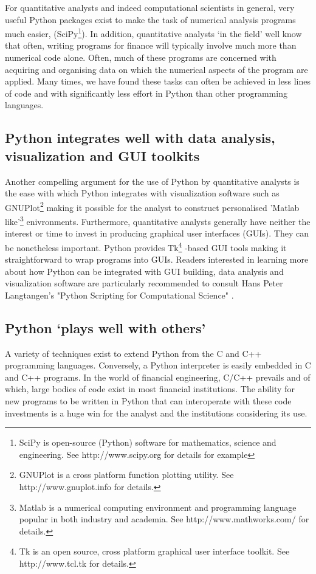 For quantitative analysts and indeed computational scientists in
general, very useful Python packages exist to make the task of
numerical analysis programs much easier, (SciPy\footnote{SciPy is
open-source (Python) software for mathematics, science and
engineering. See http://www.scipy.org for details for
example}). In addition, quantitative analysts `in the field' well know
that often, writing programs for finance will typically involve much
more than numerical code alone. Often, much of these programs are
concerned with acquiring and organising data on which the numerical
aspects of the program are applied. Many times, we have found these
tasks can often be achieved in less lines of code and with significantly
less effort in Python than other programming languages.

\subsection{Python integrates well with data analysis, visualization
and GUI toolkits}
Another compelling argument for the use of Python by quantitative
analysts is the ease with which Python integrates with visualization
software such as GNUPlot\footnote{GNUPlot is a cross platform function
plotting utility. See http://www.gnuplot.info for details.} making it
possible for the analyst to construct personalised 'Matlab
like'\footnote{Matlab is a numerical computing environment and
programming language popular in both industry and academia. See
http://www.mathworks.com/ for details.} enivronments. Furthermore,
quantitative analysts generally have neither the interest or time to
invest in producing graphical user interfaces (GUIs). They can be
nonetheless important. Python provides Tk\footnote{Tk is an open
source, cross platform graphical user interface toolkit. See
http://www.tcl.tk for details.} -based GUI tools making it
straightforward to wrap programs into GUIs. Readers interested in
learning more about how Python can be integrated with GUI building,
data analysis and visualization software are particularly recommended
to consult Hans Peter Langtangen's "Python Scripting for
Computational Science" \cite{book:PCS}.

\subsection{Python `plays well with others'}

A variety of techniques exist to extend Python from the C and C++
programming languages. Conversely, a Python interpreter is easily
embedded in C and C++ programs. In the world of financial engineering,
C/C++ prevails and of which, large bodies of code exist in most
financial institutions. The ability for new programs to be written in
Python that can interoperate with these code investments is a huge win
for the analyst and the institutions considering its use.

